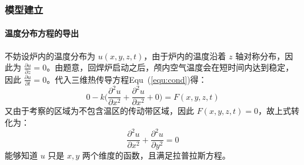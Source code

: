 \documentclass[../main.tex]{subfiles}
\begin{document}
\subsubsection{模型建立}
%
% 

\paragraph{温度分布方程的导出}
不妨设炉内的温度分布为 \(u ( x,  y  ,z ,t)\)，由于炉内的温度沿着 \(z\) 轴对称分布，因此为 \(\frac{\partial u}{ \partial z} = 0\)。由题意，回焊炉启动之后，颅内空气温度会在短时间内达到稳定，因此 \( \frac{\partial u}{ \partial t} = 0\)。代入三维热传导方程Equ~(\ref{equ:cond})得：
\begin{equation}
0 - k \bigg( \frac{\partial ^{2} u }{\partial x ^{2}} + \frac{\partial ^{2} u}{\partial x ^{2}} + 0\bigg) = F (x , y, z , t)
\end{equation}
又由于考察的区域为不包含温区的传动带区域，因此 \(F (x, y , z , t) = 0\)，故上式转化为：
\begin{equation}
\frac{\partial ^{2} u}{\partial x ^{2}} + \frac{\partial ^{2} u}{\partial y ^{2}} = 0
\end{equation}
能够知道 \(u\) 只是 \(x , y\) 两个维度的函数，且满足拉普拉斯方程。
\end{document}
